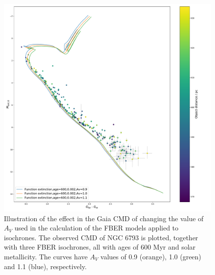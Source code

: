 \documentclass[12pt, a4paper]{report}
\begin{document}
\begin{figure}[h!]
\begin{center}
\includegraphics[width=1.0\textwidth]{../NGC_6793_CMD_FeH_0p002_Av_0p9_1p0_1p1_600Myr_isochrones_func_errorbars_T5k.pdf}
\caption{Illustration of the effect in the Gaia CMD of changing the value of $A_{V}$ used in the calculation of the FBER models applied to isochrones. The observed CMD of NGC 6793 is plotted, together with three FBER isochrones, all with ages of 600 Myr and solar metallicity. The curves have $A_{V}$ values of 0.9 (orange), 1.0 (green) and 1.1 (blue), respectively.}
\label{NGC_6793_Av_var}
\end{center}
\end{figure}
\end{document}
